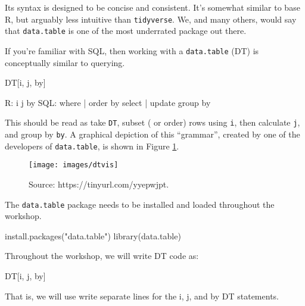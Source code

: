 \documentclass[
]{book}
\newenvironment{Shaded}{\begin{snugshade}}{\end{snugshade}}
\newcommand{\FunctionTok}[1]{\textcolor[rgb]{0.00,0.00,0.00}{#1}}
\newcommand{\NormalTok}[1]{#1}
\newcommand{\SpecialCharTok}[1]{\textcolor[rgb]{0.00,0.00,0.00}{#1}}
\newcommand{\StringTok}[1]{\textcolor[rgb]{0.31,0.60,0.02}{#1}}
\begin{document}
Its syntax is designed to be concise and consistent. It's somewhat similar to base R, but arguably less intuitive than \texttt{tidyverse}. We, and many others, would say that \texttt{data.table} is one of the most underrated package out there.

If you're familiar with SQL, then working with a \texttt{data.table} (DT) is conceptually similar to querying.

\begin{Shaded}
\begin{Highlighting}[]
\NormalTok{DT[i, j, by]}

\NormalTok{  R}\SpecialCharTok{:}\NormalTok{                 i                 j        by}
\NormalTok{SQL}\SpecialCharTok{:}\NormalTok{  where }\SpecialCharTok{|}\NormalTok{ order by   select }\SpecialCharTok{|}\NormalTok{ update  group by}
\end{Highlighting}
\end{Shaded}

This should be read as take \texttt{DT}, subset ( or order) rows using \texttt{i}, then calculate \texttt{j}, and group by \texttt{by}. A graphical depiction of this ``grammar'', created by one of the developers of \texttt{data.table}, is shown in Figure \ref{fig:dtvis}.

\begin{figure}
\texttt{[image: images/dtvis]} \caption{Source: https://tinyurl.com/yyepwjpt.}\label{fig:dtvis}
\end{figure}

The \texttt{data.table} package needs to be installed and loaded throughout the workshop.

\begin{Shaded}
\begin{Highlighting}[]
\FunctionTok{install.packages}\NormalTok{(}\StringTok{"data.table"}\NormalTok{)}
\FunctionTok{library}\NormalTok{(data.table)}
\end{Highlighting}
\end{Shaded}

Throughout the workshop, we will write DT code as:

\begin{Shaded}
\begin{Highlighting}[]
\NormalTok{DT[i,}
\NormalTok{   j,}
\NormalTok{   by]}
\end{Highlighting}
\end{Shaded}

That is, we will use write separate lines for the i, j, and by DT statements.
\end{document}
